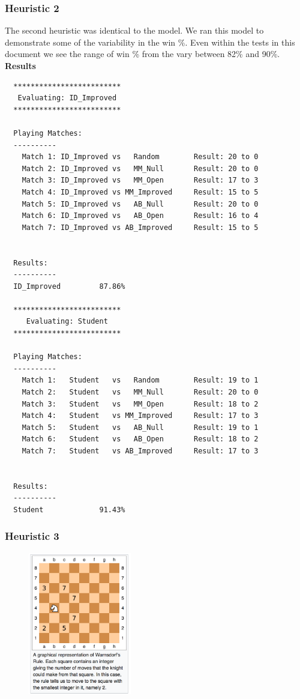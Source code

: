 \documentclass{article}
\begin{document}
\subsubsection{Heuristic 2}

The second heuristic was identical to the \texttt{} model. We ran this model to demonstrate
some of the variability in the win \%. Even within the tests in this document we see the range of win \% from the \texttt{}
vary between 82\% and 90\%.
\textbf{Results}\newline
\begin{verbatim}
  *************************
   Evaluating: ID_Improved
  *************************

  Playing Matches:
  ----------
    Match 1: ID_Improved vs   Random    	Result: 20 to 0
    Match 2: ID_Improved vs   MM_Null   	Result: 20 to 0
    Match 3: ID_Improved vs   MM_Open   	Result: 17 to 3
    Match 4: ID_Improved vs MM_Improved 	Result: 15 to 5
    Match 5: ID_Improved vs   AB_Null   	Result: 20 to 0
    Match 6: ID_Improved vs   AB_Open   	Result: 16 to 4
    Match 7: ID_Improved vs AB_Improved 	Result: 15 to 5


  Results:
  ----------
  ID_Improved         87.86%

  *************************
     Evaluating: Student
  *************************

  Playing Matches:
  ----------
    Match 1:   Student   vs   Random    	Result: 19 to 1
    Match 2:   Student   vs   MM_Null   	Result: 20 to 0
    Match 3:   Student   vs   MM_Open   	Result: 18 to 2
    Match 4:   Student   vs MM_Improved 	Result: 17 to 3
    Match 5:   Student   vs   AB_Null   	Result: 19 to 1
    Match 6:   Student   vs   AB_Open   	Result: 18 to 2
    Match 7:   Student   vs AB_Improved 	Result: 17 to 3


  Results:
  ----------
  Student             91.43%
\end{verbatim}

\subsubsection{Heuristic 3}

\begin{figure}
    \centering
    \includegraphics[width=0.4\textwidth]{chessboard}
\end{figure}
\end{document}
